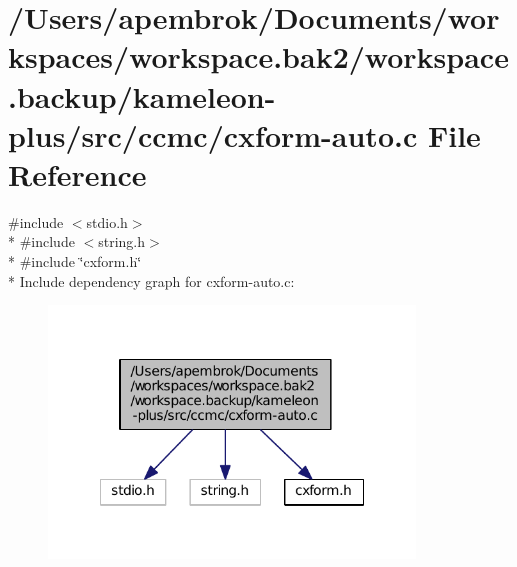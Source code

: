 \hypertarget{cxform-auto_8c}{\section{/\-Users/apembrok/\-Documents/workspaces/workspace.bak2/workspace.backup/kameleon-\/plus/src/ccmc/cxform-\/auto.c File Reference}
\label{cxform-auto_8c}
}
{\ttfamily \#include $<$stdio.\-h$>$}\\*
{\ttfamily \#include $<$string.\-h$>$}\\*
{\ttfamily \#include \char`\"{}cxform.\-h\char`\"{}}\\*
Include dependency graph for cxform-\/auto.c\-:
\nopagebreak
\begin{figure}[H]
\begin{center}
\leavevmode
\includegraphics[width=276pt]{cxform-auto_8c__incl}
\end{center}
\end{figure}
